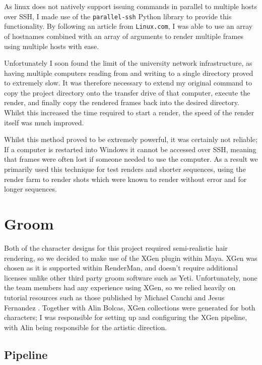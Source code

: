 \documentclass[11pt]{article}
\begin{document}
As linux does not natively support issuing commands in parallel to multiple hosts over SSH, I made use of the \texttt{parallel-ssh}\cite{pssh} Python library to provide this functionality. By following an article from \texttt{Linux.com}\cite{martin_2008}, I was able to use an array of hostnames combined with an array of arguments to render multiple frames using multiple hosts with ease.

Unfortunately I soon found the limit of the university network infrastructure, as having multiple computers reading from and writing to a single directory proved to extremely slow. It was therefore necessary to extend my original command to copy the project directory onto the transfer drive of that computer, execute the render, and finally copy the rendered frames back into the desired directory. Whilst this increased the time required to start a render, the speed of the render itself was much improved.

Whilst this method proved to be extremely powerful, it was certainly not reliable; If a computer is restarted into Windows it cannot be accessed over SSH, meaning that frames were often lost if someone needed to use the computer. As a result we primarily used this technique for test renders and shorter sequences, using the render farm to render shots which were known to render without error and for longer sequences.

\section{Groom}

Both of the character designs for this project required semi-realistic hair rendering, so we decided to make use of the XGen plugin within Maya. XGen was chosen as it is supported within RenderMan, and doesn't require additional licenses unlike other third party groom software such as Yeti. Unfortunately, none the team members had any experience using XGen, so we relied heavily on tutorial resources such as those published by Michael Cauchi \cite{cauchi_2017} and Jesus Fernandez \cite{fernandez_2018}. Together with Alin Bolcas, XGen collections were generated for both characters; I was responsible for setting up and configuring the XGen pipeline, with Alin being responsible for the artistic direction.

\subsection{Pipeline} \label{threadsafe}
\end{document}
